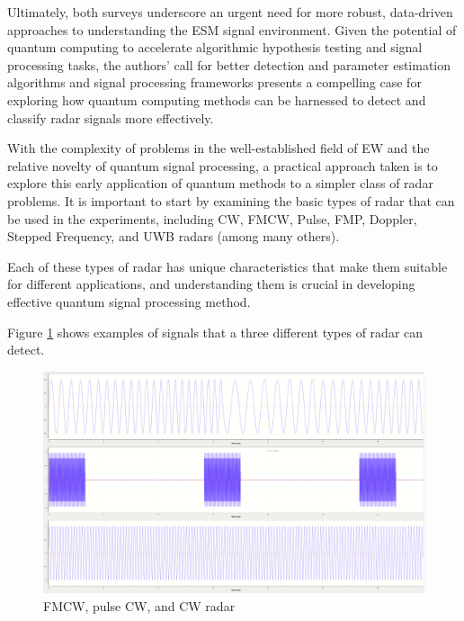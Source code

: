 Ultimately, both surveys underscore an urgent need for more robust, data-driven approaches to understanding the \ac{ESM} signal environment.
Given the potential of quantum computing to accelerate algorithmic hypothesis testing and signal processing tasks, the authors' call for better detection and parameter estimation algorithms and signal processing frameworks presents a compelling case for exploring how quantum computing methods can be harnessed to detect and classify radar signals more effectively.

With the complexity of problems in the well-established field of \ac{EW} and the relative novelty of quantum signal processing, a practical approach taken is to explore this early application of quantum methods to a simpler class of radar problems.
It is important to start by examining the basic types of radar that can be used in the experiments, including \ac{CW}, \ac{FMCW}, Pulse, \ac{FMP}, Doppler, Stepped Frequency, and \ac{UWB} radars (among many others). 

Each of these types of radar has unique characteristics that make them suitable for different applications, and understanding them is crucial in developing effective quantum signal processing method.


Figure \ref{fig:radar_types} shows examples of signals that a three different types of radar can detect.

\begin{figure}[ht]
    \centering
    \includegraphics[width=1\textwidth]{Figures/radar_types.PNG}
    \caption{\ac{FMCW}, pulse \ac{CW}, and \ac{CW} radar}
    \label{fig:radar_types}
\end{figure}


